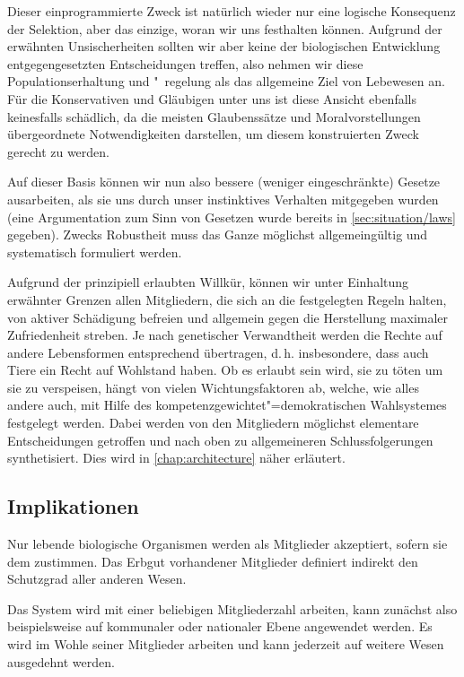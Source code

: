 Dieser einprogrammierte Zweck ist natürlich wieder nur eine logische Konsequenz der Selektion, aber das einzige, woran wir uns festhalten können. Aufgrund der erwähnten Unsischerheiten sollten wir aber keine der biologischen Entwicklung entgegengesetzten Entscheidungen treffen, also nehmen wir diese Populationserhaltung und "~regelung als das allgemeine Ziel von Lebewesen an. Für die Konservativen und Gläubigen unter uns ist diese Ansicht ebenfalls keinesfalls schädlich, da die meisten Glaubenssätze und Moralvorstellungen übergeordnete Notwendigkeiten darstellen, um diesem konstruierten Zweck gerecht zu werden.

Auf dieser Basis können wir nun also bessere (weniger eingeschränkte) Gesetze ausarbeiten, als sie uns durch unser instinktives Verhalten mitgegeben wurden (eine Argumentation zum Sinn von Gesetzen wurde bereits in \vref{sec:situation/laws} gegeben). Zwecks Robustheit muss das Ganze möglichst allgemeingültig und systematisch formuliert werden.

Aufgrund der prinzipiell erlaubten Willkür, können wir unter Einhaltung erwähnter Grenzen allen Mitgliedern, die sich an die festgelegten Regeln halten, von aktiver Schädigung befreien und allgemein gegen die Herstellung maximaler Zufriedenheit streben. Je nach genetischer Verwandtheit werden die Rechte auf andere Lebensformen entsprechend übertragen, d.\,h. insbesondere, dass auch Tiere ein Recht auf Wohlstand haben. Ob es erlaubt sein wird, sie zu töten um sie zu verspeisen, hängt von vielen Wichtungsfaktoren ab, welche, wie alles andere auch, mit Hilfe des kompetenzgewichtet"=demokratischen Wahlsystemes festgelegt werden. Dabei werden von den Mitgliedern möglichst elementare Entscheidungen getroffen und nach oben zu allgemeineren Schlussfolgerungen synthetisiert. Dies wird in \vref{chap:architecture} näher erläutert.

\subsection{Implikationen}\label{sec:basis/implications}

Nur lebende biologische Organismen werden als Mitglieder akzeptiert, sofern sie dem zustimmen. Das Erbgut vorhandener Mitglieder definiert indirekt den Schutzgrad aller anderen Wesen.

Das System wird mit einer beliebigen Mitgliederzahl arbeiten, kann zunächst also beispielsweise auf kommunaler oder nationaler Ebene angewendet werden. Es wird im Wohle seiner Mitglieder arbeiten und kann jederzeit auf weitere Wesen ausgedehnt werden.

